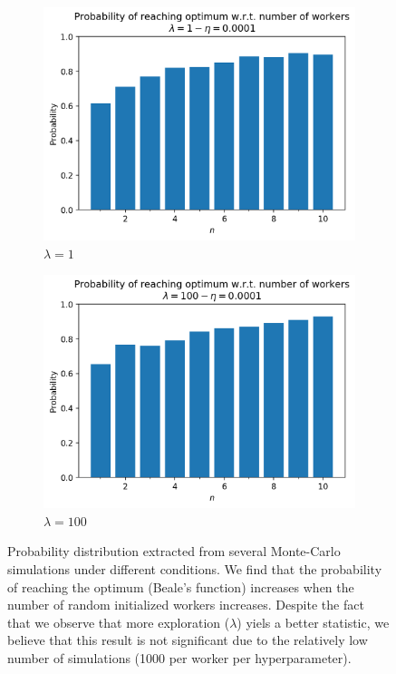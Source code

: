\begin{figure}
  \centering
  \begin{subfigure}{.35\textwidth}
    \centering
    \includegraphics[width=\linewidth]{resources/images/model_averaging_prob_1}
    \caption{$\lambda = 1$}
  \end{subfigure}
  \begin{subfigure}{.35\textwidth}
    \centering
    \includegraphics[width=\linewidth]{resources/images/model_averaging_cf_100_prob}
    \caption{$\lambda = 100$}
  \end{subfigure}
  \caption{Probability distribution extracted from several Monte-Carlo simulations under different conditions. We find that the probability of reaching the optimum (Beale's function) increases when the number of random initialized workers increases. Despite the fact that we observe that more exploration ($\lambda$) yiels a better statistic, we believe that this result is not significant due to the relatively low number of simulations (1000 per worker per hyperparameter).}
  \label{fig:model_averaging_prob}
\end{figure}

